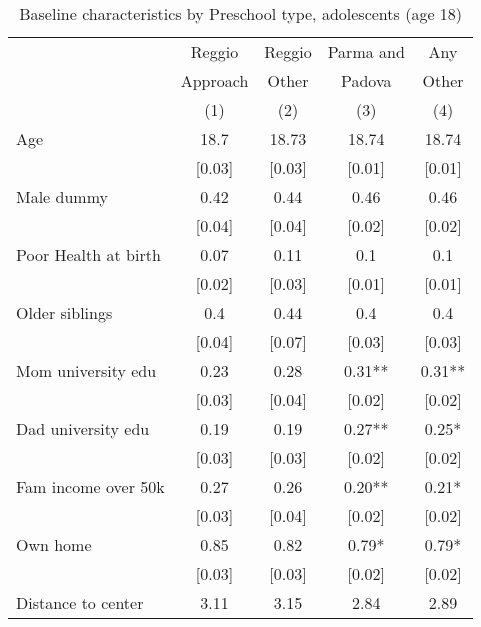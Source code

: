 \begin{table}[H]
\caption{Baseline characteristics by Preschool type, adolescents (age 18)}
\label{tab:adol_CONTROLmaterna}
\centering
\small
\begin{tabular}{l cccc}
\hline \hline 
 & Reggio & Reggio & Parma and & Any \\
 & Approach & Other & Padova & Other \\
 &   (1)    &  (2)  & (3)    &  (4) \\
\hline 

Age   &   18.7   &   18.73   &   18.74   &   18.74 \\ 
   &   [0.03]   &   [0.03]   &   [0.01]   &   [0.01] \\ 
Male dummy   &   0.42   &   0.44   &   0.46   &   0.46 \\ 
   &   [0.04]   &   [0.04]   &   [0.02]   &   [0.02] \\ 
Poor Health at birth   &   0.07   &   0.11   &   0.1   &   0.1 \\ 
   &   [0.02]   &   [0.03]   &   [0.01]   &   [0.01] \\ 
Older siblings   &   0.4   &   0.44   &   0.4   &   0.4 \\ 
   &   [0.04]   &   [0.07]   &   [0.03]   &   [0.03] \\ 
Mom university edu   &   0.23   &   0.28   &   0.31**   &   0.31** \\ 
   &   [0.03]   &   [0.04]   &   [0.02]   &   [0.02] \\ 
Dad university edu   &   0.19   &   0.19   &   0.27**   &   0.25* \\ 
   &   [0.03]   &   [0.03]   &   [0.02]   &   [0.02] \\ 
Fam income over 50k   &   0.27   &   0.26   &   0.20**   &   0.21* \\ 
   &   [0.03]   &   [0.04]   &   [0.02]   &   [0.02] \\ 
Own home   &   0.85   &   0.82   &   0.79*   &   0.79* \\ 
   &   [0.03]   &   [0.03]   &   [0.02]   &   [0.02] \\ 
Distance to center   &   3.11   &   3.15   &   2.84   &   2.89 \\ 

\end{tabular}
\end{table}
